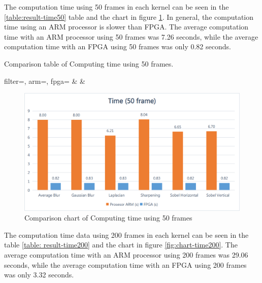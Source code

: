The computation time using 50 frames in each kernel can be seen in the \ref{table:result-time50} table and the chart in figure \ref{fig:chart-time50}. In general, the computation time using an ARM processor is slower than FPGA. The average computation time with an ARM processor using 50 frames was 7.26 seconds, while the average computation time with an FPGA using 50 frames was only 0.82 seconds.

\begin{atable}
    \caption{Comparison table of Computing time using 50 frames.}
    \label{table:hasil-time50}
        {
            filter=\filter, 
            arm=\arm, 
            fpga=\fpga}
        {
            \filter & 
            \arm & 
            \fpga }
\end{atable}
\begin{figure}[ht]
    \centering
    \includegraphics[width=0.81\linewidth, center]{images/chart/chart-time50.png}
    \caption{Comparison chart of Computing time using 50 frames}
    \label{fig:chart-time50}
\end{figure}


The computation time data using 200 frames in each kernel can be seen in the table \ref{table: result-time200} and the chart in figure \ref{fig:chart-time200}. The average computation time with an ARM processor using 200 frames was 29.06 seconds, while the average computation time with an FPGA using 200 frames was only 3.32 seconds.


